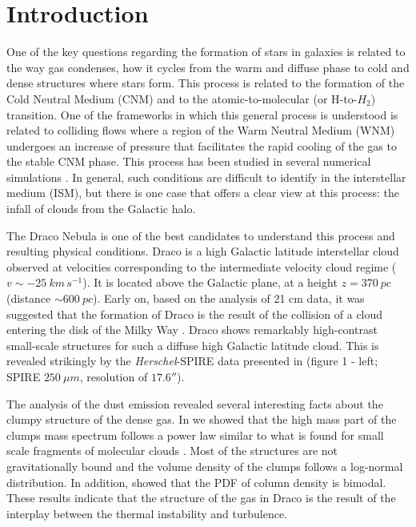 \documentclass[traditabstract]{aa}
\begin{document}


\section{Introduction}
One of the key questions regarding the formation of stars in galaxies is related to the way gas condenses, how it cycles from 
the warm and diffuse phase to cold and dense structures where stars form. This process is related to the formation of the Cold Neutral Medium (CNM) and to the atomic-to-molecular (or H-to-$H_2$) transition. 
One of the frameworks in which this general process is understood is related to colliding flows where a region of the Warm 
Neutral Medium (WNM) undergoes an increase of pressure that facilitates the rapid cooling of the gas to the stable CNM phase. 
This process has been studied in several numerical simulations \citep{Hennebelle_1999,Audit_2005,Vazquez_2006,Hennebelle_2007,
Inoue_2009,Saury_2014}. In general, such conditions are difficult to identify in the interstellar medium (ISM), but there is 
one case that offers a clear view at this process: the infall of clouds from the Galactic halo.

The Draco Nebula is one of the best candidates to understand this process and resulting physical conditions. 
Draco is a high Galactic latitude interstellar cloud observed at velocities corresponding to the intermediate velocity cloud 
regime ($v\sim -25\: km\, s^{-1}$). It is located above the Galactic plane, at a height $z=370\: pc$ (distance $\sim 600\: pc$).  
Early on, based on the analysis of 21 cm data, it was suggested that the formation of Draco is the result of the collision of a 
cloud entering the disk of the Milky Way \citep{Goerigk_1983}.
Draco shows remarkably high-contrast small-scale structures for such a diffuse high Galactic latitude cloud. 
This is revealed strikingly by the \emph{Herschel}-SPIRE data presented in \cite{MAMD_2017b} (figure 1 - left; SPIRE $250\: \mu m$, 
resolution of $17.6''$).

The analysis of the dust emission revealed several interesting facts about the clumpy structure of the dense gas. 
In \cite{MAMD_2017b} we showed that the high mass part of the clumps mass spectrum follows a power law similar to what is found 
for small scale fragments of molecular clouds \cite{Peretto_2010}. Most of the structures are not gravitationally bound and 
the volume density of the clumps follows a log-normal distribution. In addition, \cite{Schneider_2017} showed that the PDF of 
column density is bimodal. These results indicate that the structure of the gas in Draco is the result of the interplay between 
the thermal instability and turbulence.
\end{document}
